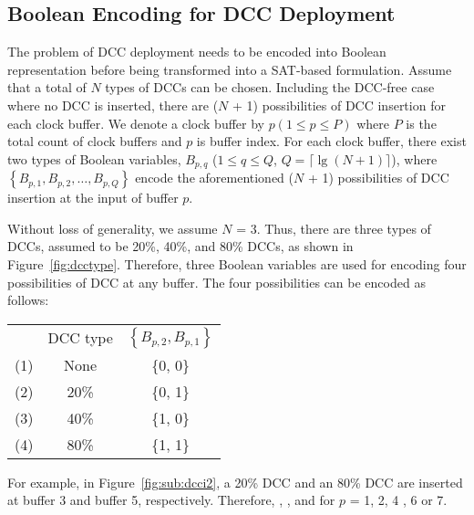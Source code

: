
\subsection{Boolean Encoding for DCC Deployment}
\label{subsec:eddcd}
The problem of DCC deployment needs to be encoded into Boolean representation before being transformed into a SAT-based formulation. Assume that a total of $N$ types of DCCs can be chosen. Including the DCC-free case where no DCC is inserted, there are ($N$ + 1) possibilities of DCC insertion for each clock buffer. We denote a clock buffer by $p\left(1 \leq p \leq P\right)$ where $P$ is the total count of clock buffers and $p$ is buffer index. For each clock buffer, there exist two types of Boolean variables, {\fontsize{9}{10}$B_{p,q}$} ($1 \leq q \leq Q $, $Q = \lceil \lg (N + 1)\rceil$), where {\fontsize{9}{10}$\left\{B_{p,1}, B_{p,2},\dotsc, B_{p,Q}\right\}$} encode the aforementioned ($N$ + 1) possibilities of DCC insertion at the input of buffer $p$.



Without loss of generality, we assume $N$ = 3. Thus, there are three types of DCCs, assumed to be 20\%, 40\%, and 80\% DCCs, as shown in Figure~\ref{fig:dcctype}. Therefore, three Boolean variables are used for encoding four possibilities of DCC at any buffer. The four possibilities can be encoded as follows:


{\small
\begin{tabular}{ c c c }
\centering
   & DCC type & $\left\{B_{p,2},B_{p,1}\right\}$ \\
  (1)\quad & None & \{0, 0\} \\
  (2)\quad & 20\% &  \{0, 1\} \\
  (3)\quad & 40\% &  \{1, 0\} \\
  (4)\quad & 80\% &  \{1, 1\} \\
\end{tabular}}


For example, in Figure~\ref{fig:sub:dcci2}, a 20\% DCC and an 80\% DCC are inserted at buffer 3 and buffer 5, respectively. Therefore, {}, {}, and {} for $p$ = 1, 2, 4 , 6 or 7.

